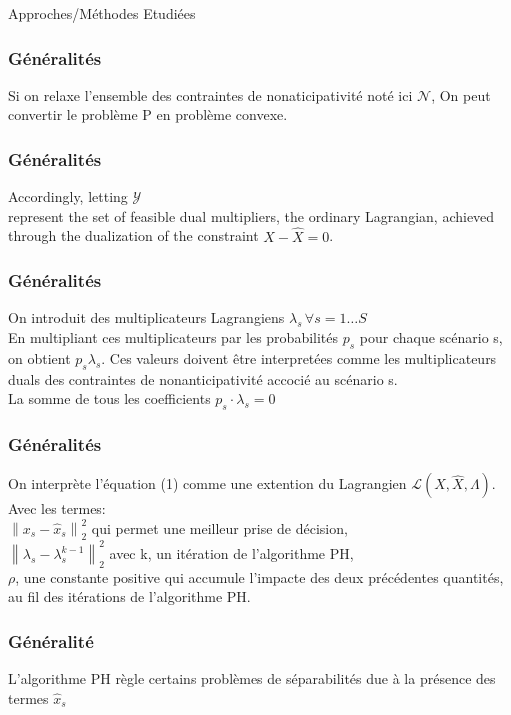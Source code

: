 \documentclass[10pt]{beamer}
\newcommand{\Lagr}{\mathcal{L}}
\newcommand\norm[1]{\left\lVert#1\right\rVert}
\begin{document}
    \begin{section}{Approches/Méthodes Etudiées}
    
    \begin{frame}
        \frametitle{Généralités}
        Si on relaxe l'ensemble des contraintes de nonaticipativité noté ici $\mathcal{N}$, On peut convertir le problème P en problème convexe.
    \end{frame}
    
    \begin{frame}
        \frametitle{Généralités}
        Accordingly, letting $\mathcal{Y}$\\ %
        represent the set of feasible dual multipliers, the ordinary Lagrangian, achieved through the dualization
of the constraint $X - \hat{X} = 0$.
    \end{frame}
    
    
    \begin{frame}
        \frametitle{Généralités}
        On introduit des multiplicateurs Lagrangiens $\lambda_s \, \forall s = 1 \ldots S$\\
        En multipliant ces multiplicateurs par les probabilités $p_s$ pour chaque scénario s, on obtient $p_s\lambda_s$. Ces valeurs doivent être interpretées comme les multiplicateurs duals des contraintes de nonanticipativité accocié au scénario s.\\
        La somme de tous les coefficients $p_s\cdot\lambda_s = 0$
    \end{frame}
    
    \begin{frame}
        \frametitle{Généralités}
        On interprète l'équation (1) comme une extention du Lagrangien $\Lagr(X, \hat{X}, \Lambda)$.\\
            
        Avec les termes:\\
        $\norm{x_s - \hat{x}_s}^{2}_{2}$ qui permet une meilleur prise de décision,\\
        $\norm{\lambda_s - \lambda^{k-1}_{s}}^{2}_{2}$ avec k, un itération de l'algorithme PH,\\
        $\rho$, une constante positive qui accumule l'impacte des deux précédentes quantités, au fil des itérations de l'algorithme PH.
    \end{frame}
    
    \begin{frame}
        \frametitle{Généralité}
        L'algorithme PH règle certains problèmes de séparabilités due à la présence des termes $\hat{x}_s$
    \end{frame}
    

\end{section}
\end{document}
